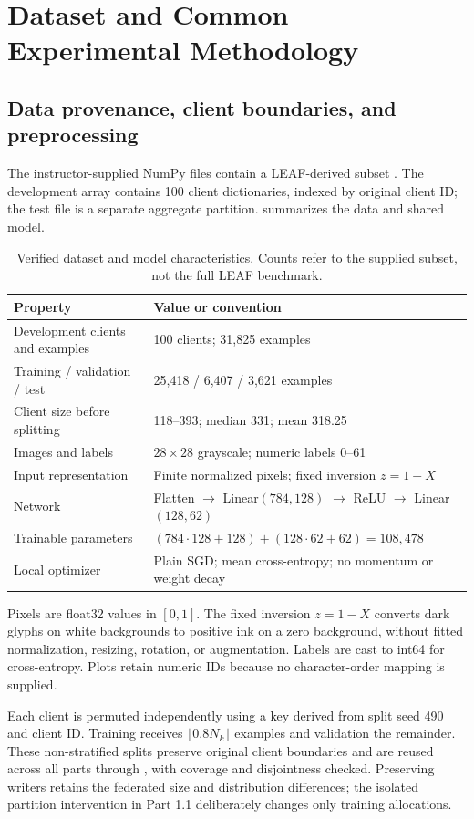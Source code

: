 \section{Dataset and Common Experimental Methodology}\label{sec:methodology}
\subsection{Data provenance, client boundaries, and preprocessing}
The instructor-supplied NumPy files contain a LEAF-derived subset \citep{leaf2018}. The development array contains 100 client dictionaries, indexed by original client ID; the test file is a separate aggregate partition.  summarizes the data and shared model.

\begin{table}[htbp]
\centering
\caption{Verified dataset and model characteristics. Counts refer to the supplied subset, not the full LEAF benchmark.}\label{tab:data}
\begin{tabularx}{\linewidth}{lY}
\toprule
Property & Value or convention\\
\midrule
Development clients and examples & 100 clients; 31,825 examples\\
Training / validation / test & 25,418 / 6,407 / 3,621 examples\\
Client size before splitting & 118--393; median 331; mean 318.25\\
Images and labels & $28\times28$ grayscale; numeric labels 0--61\\
Input representation & Finite normalized pixels; fixed inversion $z=1-X$\\
Network & Flatten $\to$ Linear$(784,128)$ $\to$ ReLU $\to$ Linear$(128,62)$\\
Trainable parameters & $(784\cdot128+128)+(128\cdot62+62)=108{,}478$\\
Local optimizer & Plain SGD; mean cross-entropy; no momentum or weight decay\\
\bottomrule
\end{tabularx}
\end{table}

Pixels are float32 values in $[0,1]$. The fixed inversion $z=1-X$ converts dark glyphs on white backgrounds to positive ink on a zero background, without fitted normalization, resizing, rotation, or augmentation. Labels are cast to int64 for cross-entropy. Plots retain numeric IDs because no character-order mapping is supplied.

Each client is permuted independently using a key derived from split seed 490 and client ID. Training receives $\lfloor0.8N_k\rfloor$ examples and validation the remainder. These non-stratified splits preserve original client boundaries and are reused across all parts through , with coverage and disjointness checked. Preserving writers retains the federated size and distribution differences; the isolated partition intervention in Part 1.1 deliberately changes only training allocations.

